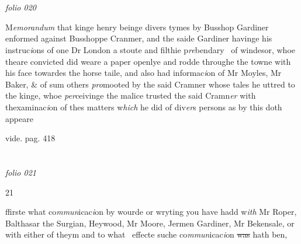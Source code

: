 \documentclass[12pt, a4paper]{book}
\begin{document}
      	
\dotfill
						  \section*{}  \subsection*{}

\textit{folio 020}



            		
            			
		\ifthenelse{\isodd{\thepage}}
		{\reversemarginpar}
		{\normalmarginpar}
		M\textit{emorandum} that kinge henry beinge divers tymes by Busshop Gardiner
            			enformed against Busshoppe Cranmer, and the saide Gardiner
 havinge his instruc\textit{i}ons of one Dr London a stoute and filthie p\textit{re}bendary 
 of windesor, whoe theare convicted did weare a paper openlye
 and rodde throughe the towne with his face towardes the horse
 taile, and also had informac\textit{i}on of Mr Moyles, Mr Baker, \& of
            			sum others \textit{pro}mooted by the said Cramner whose tales he uttred
            			to the kinge, whoe \textit{per}ceivinge the malice trusted the said Cramn\textit{er}
 with thexaminac\textit{i}on of thes matters w\textit{hich} he did of div\textit{er}s persons
 as by this doth appeare

		\ifthenelse{\isodd{\thepage}}
		{\reversemarginpar}
		{\normalmarginpar}
		vide. pag. 418
            		

\dotfill
						\newpage {} \section*{}  \subsection*{}

\textit{folio 021}


\begin{flushright}
	{\color{Mahogany}21}
\end{flushright}
	
		\ifthenelse{\isodd{\thepage}}
		{\reversemarginpar}
		{\normalmarginpar}
		ffirste what co\textit{mmun}icac\textit{i}on by wourde or wryting you have hadd w\textit{ith}
		Mr Roper, Balthasar the Surgian, Heywood, Mr Moore, Jermen
		Gardiner, Mr Bekensale, or with either of theym and to what 
 effecte suche co\textit{mmun}icac\textit{i}on \sout{was} hath ben,
            		
\end{document}
